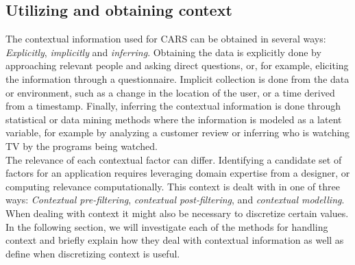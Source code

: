 \subsection{Utilizing and obtaining context}\label{subsec:utilizingandobtainingcontext}
The contextual information used for CARS can be obtained in several ways: \textit{Explicitly}, \textit{implicitly} and \textit{inferring}\cite{RecommenderHandbook2015}.
Obtaining the data is explicitly done by approaching relevant people and asking direct questions, or, for example, eliciting the information through a questionnaire.
Implicit collection is done from the data or environment, such as a change in the location of the user, or a time derived from a timestamp.
Finally, inferring the contextual information is done through statistical or data mining methods where the information is modeled as a latent variable, for example by analyzing a customer review or inferring who is watching TV by the programs being watched.
\\
The relevance of each contextual factor can differ.
Identifying a candidate set of factors for an application requires leveraging domain expertise from a designer, or computing relevance computationally.
This context is dealt with in one of three ways\cite{Adomavicius2011}: \textit{Contextual pre-filtering}, \textit{contextual post-filtering}, and \textit{contextual modelling}.
When dealing with context it might also be necessary to discretize certain values.
In the following section, we will investigate each of the methods for handling context and briefly explain how they deal with contextual information as well as define when discretizing context is useful.

